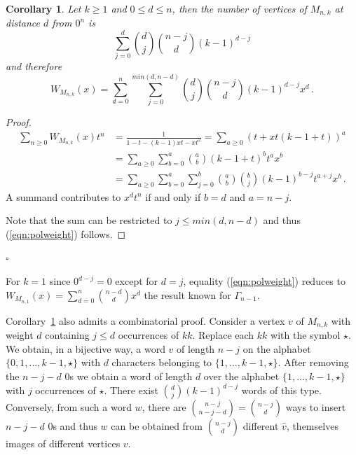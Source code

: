 \documentclass[11pt]{article}
\newtheorem{corollary}[theorem]{\bf Corollary}
\newcommand{\qed}{\hfill $\square$ \bigskip}
\begin{document}
\begin{corollary}\label{co:ndbweight}
Let $k\geq 1$ and $0\leq d \leq n$, then the number of vertices of $M_{n,k}$ at distance $d$ from $0^n$ is 
\begin{equation}\label{eqn:ndbweight}
 \sum_{j= 0}^d{\binom{d}{j}\binom{n-j}{d}(k-1)^{d-j}}
\end{equation}
and therefore 
\begin{equation}\label{eqn:polweight}
 W_{M_{n,k}}(x)=\sum_{d=0}^{n}{\sum_{j= 0}^{min (d,n-d)}{\binom{d}{j}\binom{n-j}{d}(k-1)^{d-j}}x^d}\,.
\end{equation}
\end{corollary}
\begin{proof}
\begin{align*}
\sum_{n\geq0}{ W_{M_{n,k}}(x)t^n}&=\frac{1}{1-t-(k-1)x t -xt^2}=\sum_{a\geq0}{(t+x t (k-1+t))^a}\\
       & = \sum_{a\geq0}{\sum_{b=0}^{a}{\binom{a}{b} (k-1+t)^b t^a x^b}}\\
			& = \sum_{a\geq0}{\sum_{b=0}^{a}{\sum_{j=0}^{b}{\binom{a}{b}\binom{b}{j} (k-1)^{b-j} t^{a+j} x^b}}}\,.
\end{align*}
A summand contributes to $x^dt^n$ if and only if $b=d$ and $a=n-j$.

Note that the sum can be restricted to $j\leq min(d,n-d)$ and thus (\ref{eqn:polweight}) follows.

\end{proof}
\qed
 
For $k=1$ since $0^{d-j}=0$ except for $d=j$, equality (\ref{eqn:polweight}) reduces to $W_{M_{n,1}}(x)=\sum_{d=0}^{n}\binom{n-d}{d}x^d$ the result known for $\Gamma_{n-1}$.

Corollary~\ref{co:ndbweight} also admits a combinatorial proof. Consider a vertex $v$ of $M_{n,k}$ with weight $d$ containing $j\leq d$ occurrences of $kk$. Replace each $kk$ with the symbol $\star$.  We obtain, in a bijective way, a word $\widehat{v}$ of length $n-j$ on the alphabet $\{0,1,\ldots,k-1,\star\}$ with $d$ characters belonging to $\{1,\ldots,k-1,\star\}$. After removing the $n-j-d$ $0$s we obtain a word of length $d$  over the alphabet $\{1,\ldots,k-1,\star\}$ with $j$ occurrences of $\star$. There exist $\binom{d}{j}(k-1)^{d-j}$ words of this type.
Conversely, from such a word $w$, there are $\binom{n-j}{n-j-d}=\binom{n-j}{d}$ ways to insert ${n-j-d}$ $0$s and thus  $w$ can be obtained from $\binom{n-j}{d}$ different $\widehat{v}$, themselves images of  different vertices $v$.
\end{document}

